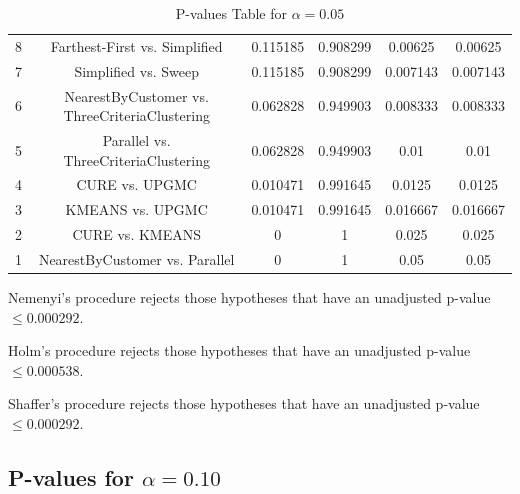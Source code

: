 \documentclass[a4paper,10pt]{article}
\begin{document}
\begin{landscape}
\begin{table}[!htp]
\begin{tabular}{cccccc}
8&Farthest-First vs. Simplified&0.115185&0.908299&0.00625&0.00625\\
7&Simplified vs. Sweep&0.115185&0.908299&0.007143&0.007143\\
6&NearestByCustomer vs. ThreeCriteriaClustering&0.062828&0.949903&0.008333&0.008333\\
5&Parallel vs. ThreeCriteriaClustering&0.062828&0.949903&0.01&0.01\\
4&CURE vs. UPGMC&0.010471&0.991645&0.0125&0.0125\\
3&KMEANS vs. UPGMC&0.010471&0.991645&0.016667&0.016667\\
2&CURE vs. KMEANS&0&1&0.025&0.025\\
1&NearestByCustomer vs. Parallel&0&1&0.05&0.05\\
\hline
\end{tabular}
\caption{P-values Table for $\alpha=0.05$}
\end{table}Nemenyi's procedure rejects those hypotheses that have an unadjusted p-value $\le0.000292$.

Holm's procedure rejects those hypotheses that have an unadjusted p-value $\le0.000538$.

Shaffer's procedure rejects those hypotheses that have an unadjusted p-value $\le0.000292$.

\pagebreak

\subsection{P-values for $\alpha=0.10$}


\end{landscape}
\end{document}
